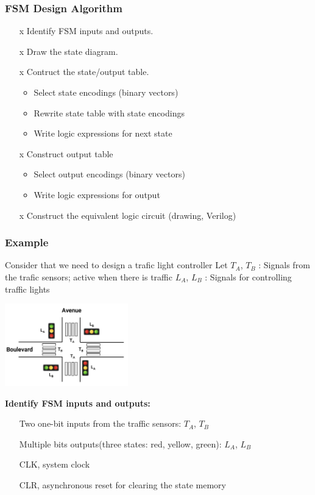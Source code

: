 \documentclass[12pt,openany]{book}
\begin{document}
\subsubsection{FSM Design Algorithm}
\begin{itemize}
	\item[x] Identify FSM inputs and outputs.
	\item[x] Draw the state diagram.
	\item[x] Contruct the state/output table.
	\begin{itemize}
		\item Select state encodings (binary vectors)
		\item Rewrite state table with state encodings
		\item Write logic expressions for next state
	\end{itemize}
	\item[x] Construct output table
	\begin{itemize}
		\item Select output encodings (binary vectors)
		\item Write logic expressions for output 
	\end{itemize}
	\item[x] Construct the equivalent logic circuit (drawing, Verilog)
\end{itemize}

\subsubsection{Example}
Consider that we need to design a trafic light controller
Let $T_A$, $T_B$ : Signals from the trafic sensors; active when there is traffic
$L_A$, $L_B$ : Signals for controlling traffic lights 
\begin{center}
	\includegraphics[width=0.4\textwidth]{circuits/13.3.png}
\end{center}

\textbf{Identify FSM inputs and outputs:}
\begin{itemize}
	\item[] Two one-bit inputs from the traffic sensors: $T_A$, $T_B$
	\item[] Multiple bits outputs(three states: red, yellow, green): $L_A$, $L_B$
	\item[] CLK, system clock
	\item[] CLR, asynchronous reset for clearing the state memory
\end{itemize}
\end{document}
